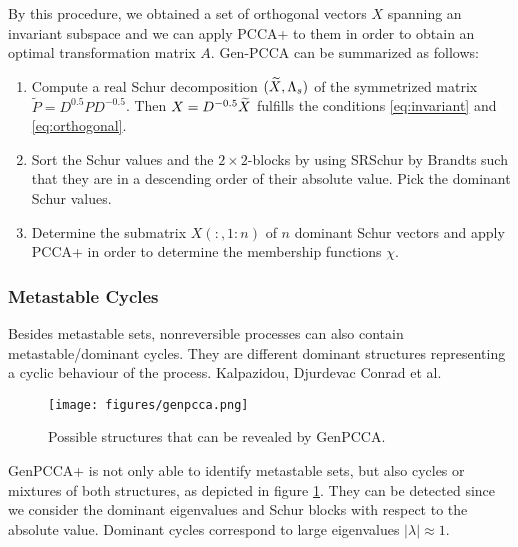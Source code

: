 By this procedure, we obtained a set of orthogonal vectors $X$ spanning an invariant subspace and we can apply PCCA+ to them in order to obtain an optimal transformation matrix $A$.
Gen-PCCA can be summarized as follows:
\begin{enumerate}
\item Compute a real Schur decomposition $(\widetilde{X}, \Lambda_s)$ of the symmetrized matrix $\widetilde{P} = D^{0.5} P D^{-0.5}$. Then $X = D^{-0.5} \widetilde{X}$ fulfills the conditions \eqref{eq:invariant} and \eqref{eq:orthogonal}. %
\item Sort the Schur values and the $2 \times 2$-blocks by using SRSchur by Brandts\cite{brandts2002matlab} such that they are in a descending order of their absolute value. Pick the dominant Schur values.
\item Determine the submatrix $X(:,1:n)$ of $n$ dominant Schur vectors and apply PCCA+ in order to determine the membership functions $\chi$.
\end{enumerate}


\subsubsection*{Metastable Cycles}

Besides metastable sets, nonreversible processes can also contain metastable/dominant cycles. They are  different dominant structures representing a cyclic behaviour of the process.
Kalpazidou\cite{kalpazidou2007}, Djurdevac Conrad et al\cite{djur2016}.

\begin{figure}[!ht]
	\centering
	\texttt{[image: figures/genpcca.png]}
	\caption{Possible structures that can be revealed by GenPCCA.}
	\label{fig:genpcca}
\end{figure}

GenPCCA+ is not only able to identify metastable sets, but also cycles or mixtures of both structures, as depicted in figure \ref{fig:genpcca}. 
They can be detected since we consider the dominant eigenvalues and Schur blocks with respect to the absolute value.
Dominant cycles correspond to large eigenvalues $|\lambda| \approx 1$.
\newpage


